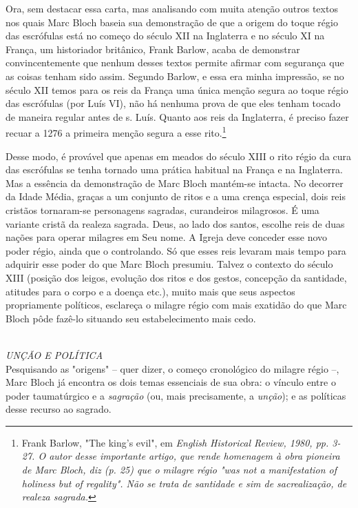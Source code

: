 \documentclass[a5paper]{book}
\begin{document}
Ora, sem destacar essa carta, mas analisando com muita atenção outros textos nos quais Marc Bloch baseia sua demonstração de que a origem do toque régio das escrófulas está no começo do século XII na Inglaterra e no século XI na França, um historiador britânico, Frank Barlow, acaba de demonstrar convincentemente que nenhum desses textos permite afirmar com segurança que as coisas tenham sido assim. Segundo Barlow, e essa era minha impressão, se no século XII temos para os reis da França uma única menção segura ao toque régio das escrófulas (por Luís VI), não há nenhuma prova de que eles tenham tocado de maneira regular antes de s. Luís. Quanto aos reis da Inglaterra, é preciso fazer recuar a 1276 a primeira menção segura a esse rito.\footnote{Frank Barlow, "The king's evil", em \textit{English Historical Review, 1980, pp. 3-27. O autor desse importante artigo, que rende homenagem à obra pioneira de Marc Bloch, diz (p. 25) que o milagre régio "was not a manifestation of holiness but of regality". Não se trata de santidade e sim de sacrealização, de realeza sagrada.}}

Desse modo, é provável que apenas em meados do século XIII o rito régio da cura das escrófulas se tenha tornado uma prática habitual na França e na Inglaterra. Mas a essência da demonstração de Marc Bloch mantém-se intacta. No decorrer da Idade Média, graças a um conjunto de ritos e a uma crença especial, dois reis cristãos tornaram-se personagens sagradas, curandeiros milagrosos. É uma variante cristã da realeza sagrada. Deus, ao lado dos santos, escolhe reis de duas nações para operar milagres em Seu nome. A Igreja deve conceder esse novo poder régio, ainda que o controlando. Só que esses reis levaram mais tempo para adquirir esse poder do que Marc Bloch presumiu. Talvez o contexto do século XIII (posição dos leigos, evolução dos ritos e dos gestos, concepção da santidade, atitudes para o corpo e a doença etc.), muito mais que seus aspectos propriamente políticos, esclareça o milagre régio com mais exatidão do que Marc Bloch pôde fazê-lo situando seu estabelecimento mais cedo.

~\\ \large \textit{UNÇÃO E POLÍTICA} ~\\

Pesquisando as "origens" {--} quer dizer, o começo cronológico do milagre régio --, Marc Bloch já encontra os dois temas essenciais de sua obra: o vínculo entre o poder taumatúrgico e a \textit{sagração} (ou, mais precisamente, a \textit{unção}); e as políticas desse recurso ao sagrado.
\end{document}
